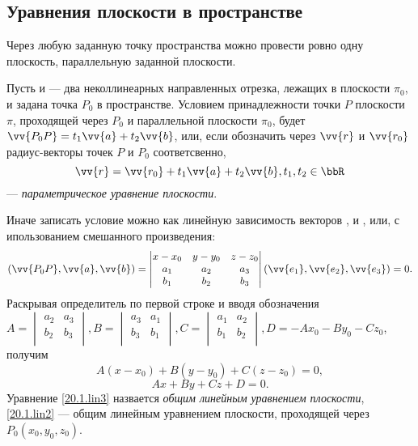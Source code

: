 \subsection{Уравнения плоскости в пространстве}
\begin{axiome}
Через любую заданную точку пространства можно провести ровно одну плоскость, параллельную заданной плоскости.
\end{axiome}

Пусть  и  --- два неколлинеарных направленных отрезка, лежащих в плоскости $\pi_0$, и задана точка $P_0$ в пространстве. Условием принадлежности точки $P$ плоскости $\pi$, проходящей через $P_0$ и параллельной плоскости $\pi_0$, будет $\vv{P_0P}=t_1\vv{a}+t_2\vv{b}$, или, если обозначить через $\vv{r}$ и $\vv{r_0}$ радиус-векторы точек $P$ и $P_0$ соответсвенно,
\begin{equation}\label{20.1.par3}
\vv{r}=\vv{r_0}+t_1\vv{a}+t_2\vv{b}, t_1,t_2 \in \bbR
\end{equation}
--- \textit{параметрическое уравнение плоскости}.

Иначе записать условие можно как линейную зависимость векторов ,  и , или, с ипользованием смешанного произведения:
\begin{equation}\label{20.1.mix1}
(\vv{P_0P},\vv{a}, \vv{b})=\begin{vmatrix}
x-x_0 & y-y_0 & z-z_0 \\
a_1 & a_2 & a_3 \\
b_1 & b_2 & b_3 \\
\end{vmatrix}(\vv{e_1},\vv{e_2},\vv{e_3})=0.
\end{equation}
Раскрывая определитель по первой строке и вводя обозначения $A=\begin{vmatrix}
a_2 & a_3 \\
b_2 & b_3 \\
\end{vmatrix}, B=\begin{vmatrix}
a_3 & a_1 \\
b_3 & b_1 \\
\end{vmatrix}, C=\begin{vmatrix}
a_1 & a_2 \\
b_1 & b_2 \\
\end{vmatrix}, D=-Ax_0-By_0-Cz_0$, получим
\begin{equation}\label{20.1.lin2}
A(x-x_0)+B(y-y_0)+C(z-z_0)=0,
\end{equation}
\begin{equation}\label{20.1.lin3}
Ax+By+Cz+D=0.
\end{equation}
Уравнение \eqref{20.1.lin3} назвается \textit{общим линейным уравнением плоскости}, \eqref{20.1.lin2} --- общим линейным уравнением плоскости, проходящей через $P_0(x_0,y_0,z_0)$.

